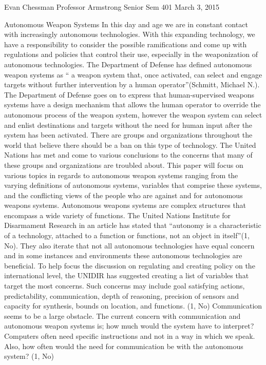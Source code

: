 \documentclass{report}
\begin{document}
Evan Chessman
Professor Armstrong
Senior Sem 401
March 3, 2015
 
Autonomous Weapon Systems
In this day and age we are in constant contact with increasingly autonomous technologies. With this expanding technology, we have a responsibility to consider the possible ramifications and come up with regulations and policies that control their use, especially in the weaponization of autonomous technologies. The Department of Defense has defined autonomous weapon systems as “ a weapon system that, once activated, can select and engage targets without further intervention by a human operator”(Schmitt, Michael N.). The Department of Defense goes on to express that human-supervised weapons systems have a design mechanism that allows the human operator to override the autonomous process of the weapon system, however the weapon system can select and enlist destinations and targets without the need for human input after the system has been activated. There are groups and organizations throughout the world that believe there should be a ban on this type of technology. The United Nations has met and come to various conclusions to the concerns that many of these groups and organizations are troubled about. This paper will focus on various topics in regards to autonomous weapon systems ranging from the varying definitions of autonomous systems, variables that comprise these systems, and the conflicting views of the people who are against and for autonomous weapons systems.
Autonomous weapons systems are complex structures that encompass a wide variety of functions. The United Nations Institute for Disarmament Research in an article has stated that “autonomy is a characteristic of a technology, attached to a function or functions, not an object in itself”(1, No). They also iterate that not all autonomous technologies have equal concern and in some instances and environments these autonomous technologies are beneficial. To help focus the discussion on regulating and creating policy on the international level, the UNIDIR has suggested creating a list of variables that target the most concerns. Such concerns may include goal satisfying actions, predictability, communication, depth of reasoning, precision of sensors and capacity for synthesis, bounds on location, and functions. (1, No)
Communication seems to be a large obstacle. The current concern with communication and autonomous weapon systems is; how much would the system have to interpret? Computers often need specific instructions and not in a way in which we speak. Also, how often would the need for communication be with the autonomous system? (1, No)
\end{document}
